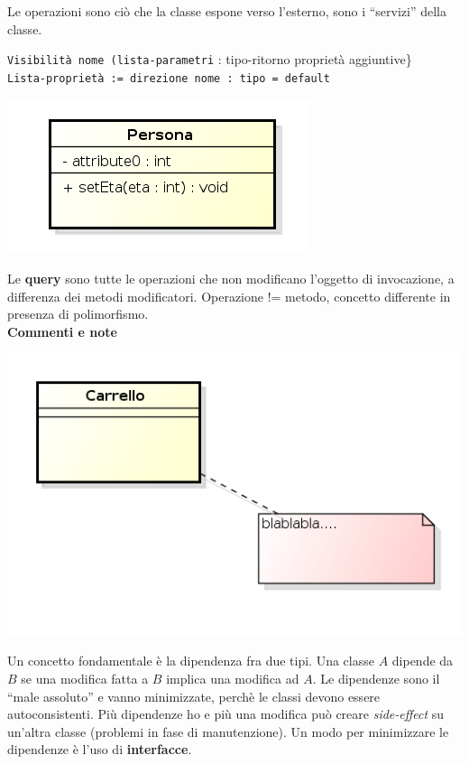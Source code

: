 Le operazioni sono ciò che la classe espone verso l'esterno, sono i ``servizi'' della classe.

\begin{center}

\texttt{Visibilità nome (lista-parametri} : tipo-ritorno {proprietà aggiuntive\}}\\
\texttt{Lista-proprietà := direzione nome : tipo = default}

\end{center}

\begin{center}

\includegraphics[width=0.75\columnwidth]{img8} %

\end{center}

Le \textbf{query} sono tutte le operazioni che non modificano l'oggetto di invocazione, a differenza dei metodi modificatori. Operazione != metodo, concetto differente in presenza di polimorfismo.\\\textbf{Commenti e note}

\begin{center}

\includegraphics[width=0.75\columnwidth]{img9} %

\end{center}

Un concetto fondamentale è la dipendenza fra due tipi. Una classe $A$ dipende da $B$ se una modifica fatta a $B$ implica una modifica ad $A$. Le dipendenze sono il ``male assoluto'' e vanno minimizzate, perchè le classi devono essere autoconsistenti. Più dipendenze ho e più una modifica può creare \textit{side-effect} su un'altra classe (problemi in fase di manutenzione). Un modo per minimizzare le dipendenze è l'uso di \textbf{interfacce}.

